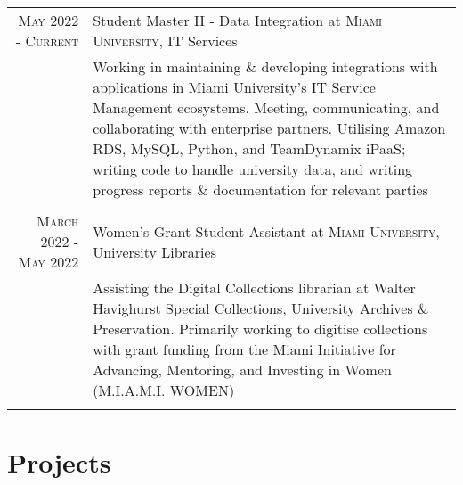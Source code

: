 \documentclass[letterpaper,10pt]{article} %
\begin{document}
{{\begin{tabular}{r|p{11cm}}

\textsc{May 2022 - Current} & Student Master II - Data Integration at \textsc{Miami University}, IT Services \emph{}\\
& \footnotesize{Working in maintaining \& developing integrations with applications in Miami University's IT Service Management ecosystems. Meeting, communicating, and collaborating with enterprise partners.
Utilising Amazon RDS, MySQL, Python, and TeamDynamix iPaaS; writing code to handle university data, and writing progress reports \& documentation for relevant parties}\\
\multicolumn{2}{c}{} \\


\textsc{March 2022 - May 2022} & Women's Grant Student Assistant at \textsc{Miami University}, University Libraries \emph{}\\
& \footnotesize{Assisting the Digital Collections librarian at Walter Havighurst Special Collections, University Archives \& Preservation.
Primarily working to digitise collections with grant funding from the Miami Initiative for Advancing, Mentoring, and Investing in Women (M.I.A.M.I. WOMEN)}\\
\multicolumn{2}{c}{} \\
\end{tabular}\normalsize


\section{Projects}

}}
\end{document}
